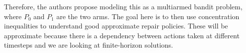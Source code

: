 \documentclass[english]{article}
\numberwithin{equation}{section}
\begin{document}
	Therefore, the authors propose modeling this as a multiarmed bandit problem, where $P_0$ and $P_1$ are the two arms. The goal here is to then use concentration inequalities to understand good approximate repair policies. These will be approximate because there is a dependency between actions taken at different timesteps and we are looking at finite-horizon solutions.
	
	
	
\end{document}
